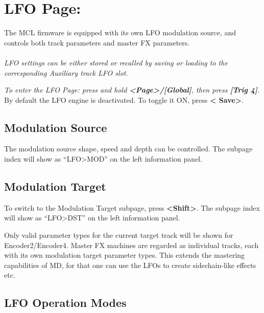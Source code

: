 \chapter{LFO Page:}
The MCL firmware is equipped with its own LFO modulation source, and controls both track parameters and master FX parameters.\\\\\textit{LFO settings can be either stored or recalled by saving or loading to the corresponding Auxiliary track LFO slot.}

\textit{To enter the LFO Page: press and hold \textbf{<Page>/[Global]}, then press \textbf{[Trig 4]}.}
\\
By default the LFO engine is deactivated. To toggle it ON, press \textbf{< Save>}.
\section{Modulation Source}

The modulation source shape, speed and depth can be controlled. The subpage index will show as ``LFO>MOD'' on the left information panel.


\newpage


\section{Modulation Target}
To switch to the Modulation Target subpage, press \textbf{<Shift>}. The subpage index will show as ``LFO>DST'' on the left information panel.


Only valid parameter types for the current target track will be shown for Encoder2/Encoder4. Master FX machines are regarded as individual tracks, each with its own modulation target parameter types. This extends the mastering capabilities of MD, for that one can use the LFOs to create sidechain-like effects etc.


\section{LFO Operation Modes}

